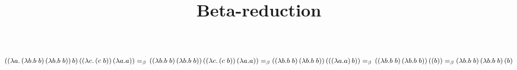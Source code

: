 \documentclass{article}
\title{Beta-reduction}
\begin{document}
\maketitle
$\left(\left(\lambda a.\left(\lambda b.b\;b\right)\left(\lambda b.b\;b\right)\right)b\right)\left(\left(\lambda c.\left(c\;b\right)\right)\left(\lambda a.a\right)\right)=_\beta\\
\left(\left(\lambda b.b\;b\right)\left(\lambda b.b\;b\right)\right)\left(\left(\lambda c.\left(c\;b\right)\right)\left(\lambda a.a\right)\right)=_\beta\left(\left(\lambda b.b\;b\right)\left(\lambda b.b\;b\right)\right)\left(\left(\left(\lambda a.a\right)b\right)\right)=_\beta\\ \left(\left(\lambda b.b\;b\right)\left(\lambda b.b\;b\right)\right)\left(\left(b\right)\right)=_\beta\left(\lambda b.b\;b\right)\left(\lambda b.b\;b\right)\left(b\right)
$
\end{document}
